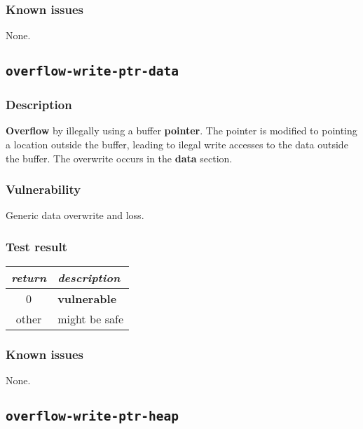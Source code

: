 \documentclass[a4paper]{book}
\begin{document}
\subsubsection{Known issues}

None.

\newpage

\subsection{\texttt{overflow-write-ptr-data}}\label{test-overflow-write-ptr-data}

\subsubsection{Description}

\textbf{Overflow} by illegally using a buffer \textbf{pointer}.
The pointer is modified to pointing a location outside the buffer,
leading to ilegal write accesses to the data outside the buffer.
The overwrite occurs in the \textbf{data} section.

\subsubsection{Vulnerability}
Generic data overwrite and loss.

\subsubsection{Test result}

\begin{tabular}{cl}
  \toprule
  \emph{return}  & \emph{description} \\
  \midrule
  0              & \textbf{vulnerable} \\
  other          & might be safe \\
  \bottomrule
\end{tabular}

\subsubsection{Known issues}

None.

\newpage

\subsection{\texttt{overflow-write-ptr-heap}}\label{test-overflow-write-ptr-heap}
\end{document}
